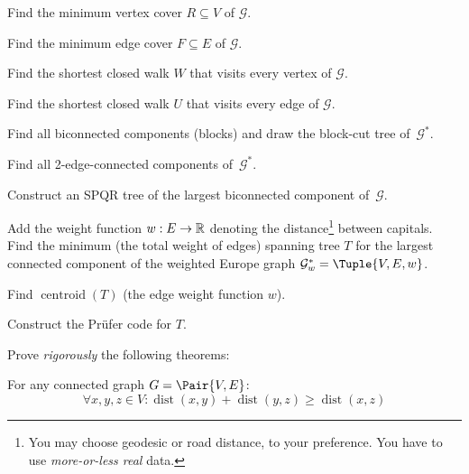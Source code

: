 \documentclass[a4paper,12pt]{article}
\newcommand{\MyGraph}{\mathcal{G}}
\newcommand{\MyGraphFull}{\MyGraph^{*}}
\newcommand{\op}[1]{\operatorname*{#1}}
\newcommand{\dist}[1]{\op{dist}(#1)}
\newcommand{\graphRadius}[1]{\op{rad}(#1)}
\newcommand{\graphDiameter}[1]{\op{diam}(#1)}
\newcommand{\graphCentroid}[1]{\op{centroid}(#1)}
\begin{document}
\begin{tasks}
\begin{subtasks}
        \item Find the minimum vertex cover $R \subseteq V$ of $\MyGraph$.

        \item Find the minimum edge cover $F \subseteq E$ of $\MyGraph$.

        \item Find the shortest closed walk $W$ that visits every vertex of $\MyGraph$.

        \item Find the shortest closed walk $U$ that visits every edge of $\MyGraph$.

        \item Find all biconnected components (blocks) and draw the block-cut tree of~$\MyGraphFull$.

        \item Find all 2-edge-connected components of~$\MyGraphFull$.

        \item Construct an SPQR tree of the largest biconnected component of~$\MyGraph$.

        \item Add the weight function $w : E \to \mathbb{R}$ denoting the distance\footnote{You may choose geodesic or road distance, to your preference. You have to use \emph{more-or-less real} data.} between capitals.
        Find the minimum (\wrt the total weight of edges) spanning tree $T$ for the largest connected component of the weighted Europe graph $\MyGraphFull_{w} = \Tuple{V, E, w}$.

        \item Find $\graphCentroid{T}$ (\wrt the edge weight function $w$).

        \item Construct the Pr\"{u}fer code for $T$.
    \end{subtasks}


    \item Prove \emph{rigorously} the following theorems:

    \begin{theorem}
        For any connected graph $G = \Pair{V, E}$:
        \[
            \forall x,y,z \in V : \dist{x,y} + \dist{y,z} \geq \dist{x,z}
        \]
    \end{theorem}



\end{tasks}
\end{document}
